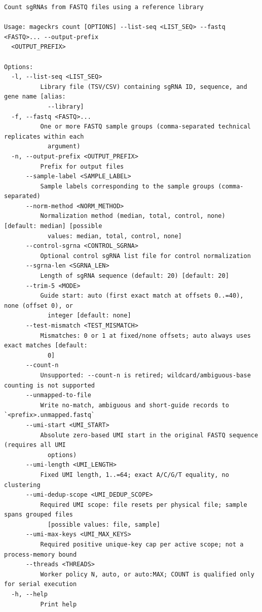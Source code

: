 \documentclass[11pt,a4paper]{article}
\makeatletter
\renewcommand\subsection{\@startsection{subsection}{2}{\z@}{-2.5ex plus -.8ex minus -.2ex}{.8ex plus .2ex}{\normalfont\large\bfseries\color{ManualBlue}}}
\makeatother
\begin{document}
\begin{verbatim}
Count sgRNAs from FASTQ files using a reference library

Usage: mageckrs count [OPTIONS] --list-seq <LIST_SEQ> --fastq <FASTQ>... --output-prefix
  <OUTPUT_PREFIX>

Options:
  -l, --list-seq <LIST_SEQ>
          Library file (TSV/CSV) containing sgRNA ID, sequence, and gene name [alias:
            --library]
  -f, --fastq <FASTQ>...
          One or more FASTQ sample groups (comma-separated technical replicates within each
            argument)
  -n, --output-prefix <OUTPUT_PREFIX>
          Prefix for output files
      --sample-label <SAMPLE_LABEL>
          Sample labels corresponding to the sample groups (comma-separated)
      --norm-method <NORM_METHOD>
          Normalization method (median, total, control, none) [default: median] [possible
            values: median, total, control, none]
      --control-sgrna <CONTROL_SGRNA>
          Optional control sgRNA list file for control normalization
      --sgrna-len <SGRNA_LEN>
          Length of sgRNA sequence (default: 20) [default: 20]
      --trim-5 <MODE>
          Guide start: auto (first exact match at offsets 0..=40), none (offset 0), or
            integer [default: none]
      --test-mismatch <TEST_MISMATCH>
          Mismatches: 0 or 1 at fixed/none offsets; auto always uses exact matches [default:
            0]
      --count-n
          Unsupported: --count-n is retired; wildcard/ambiguous-base counting is not supported
      --unmapped-to-file
          Write no-match, ambiguous and short-guide records to `<prefix>.unmapped.fastq`
      --umi-start <UMI_START>
          Absolute zero-based UMI start in the original FASTQ sequence (requires all UMI
            options)
      --umi-length <UMI_LENGTH>
          Fixed UMI length, 1..=64; exact A/C/G/T equality, no clustering
      --umi-dedup-scope <UMI_DEDUP_SCOPE>
          Required UMI scope: file resets per physical file; sample spans grouped files
            [possible values: file, sample]
      --umi-max-keys <UMI_MAX_KEYS>
          Required positive unique-key cap per active scope; not a process-memory bound
      --threads <THREADS>
          Worker policy N, auto, or auto:MAX; COUNT is qualified only for serial execution
  -h, --help
          Print help
\end{verbatim}

\subsection{test}\label{test}
\end{document}
